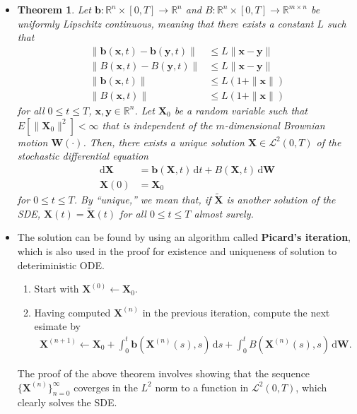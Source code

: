 \documentclass[10pt]{article}
\newtheorem{theorem}[lemma]{Theorem}
\newcommand{\dee}{\mathrm{d}}
\newcommand{\ve}[1]{\mathbf{#1}}
\newcommand{\mcal}[1]{\mathcal{#1}}
\newcommand{\Real}{\mathbb{R}}
\begin{document}
\begin{itemize}
  \item \begin{theorem} \label{theorem:existence-and-uniqueness-of-solution}
    Let $\ve{b}: \Real^n \times [0,T] \rightarrow \Real^n$ and $B: \Real^n \times [0,T] \rightarrow \Real^{m \times n}$ be uniformly Lipschitz continuous, meaning that there exists a constant $L$ such that
    \begin{align*}
      \| \ve{b}(\ve{x},t) - \ve{b}(\ve{y},t) \| &\leq L\| \ve{x} - \ve{y} \| \\
      \| B(\ve{x},t) - B(\ve{y},t) \| &\leq L\| \ve{x} - \ve{y} \| \\
      \| \ve{b}(\ve{x},t) \| &\leq L(1 + \| \ve{x} \|) \\
      \| B(\ve{x},t) \| &\leq L(1 + \| \ve{x} \|)
    \end{align*}
    for all $0 \leq t \leq T$, $\ve{x}, \ve{y} \in \Real^n$. Let $\ve{X}_0$ be a random variable such that $E[\| \ve{X}_0\|^2] < \infty$ that is independent of the $m$-dimensional Brownian motion $\ve{W}(\cdot)$. Then, there exists a unique solution $\ve{X} \in \mcal{L}^2(0,T)$ of the stochastic differential equation
    \begin{align*}
      \dee \ve{X} &= \ve{b}(\ve{X},t)\, \dee t + B(\ve{X}, t)\, \dee\ve{W} \\
      \ve{X}(0) &= \ve{X}_0
    \end{align*}
    for $0 \leq t \leq T$. By ``unique,'' we mean that, if $\widetilde{\ve{X}}$ is another solution of the SDE, $\ve{X}(t) = \widetilde{\ve{X}}(t)$ for all $0 \leq t \leq T$ almost surely.
  \end{theorem}

  \item The solution can be found by using an algorithm called {\bf Picard's iteration}, which is also used in the proof for existence and uniqueness of solution to deteriministic ODE.
  \begin{enumerate}
    \item Start with $\ve{X}^{(0)} \gets \ve{X}_0$.
    \item Having computed $\ve{X}^{(n)}$ in the previous iteration, compute the next esimate by
    \begin{align*}
      \ve{X}^{(n+1)} \gets \ve{X}_0 + \int_{0}^t \ve{b}(\ve{X}^{(n)}(s), s)\, \dee s + \int_0^t B(\ve{X}^{(n)}(s), s)\, \dee\ve{W}.
    \end{align*}
  \end{enumerate}
  The proof of the above theorem involves showing that the sequence $\{ \ve{X}^{(n)} \}_{n=0}^\infty$ coverges in the $L^2$ norm to a function in $\mcal{L}^2(0,T)$, which clearly solves the SDE.


\end{itemize}
\end{document}
